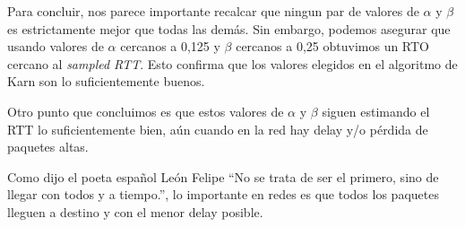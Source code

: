 Para concluir, nos parece importante recalcar que ningun par de valores de $\alpha$ y $\beta$ es estrictamente mejor que todas las demás. Sin embargo, podemos asegurar que usando valores de $\alpha$ cercanos a 0,125 y $\beta$ cercanos a 0,25 obtuvimos un RTO cercano al \emph{sampled RTT}. Esto confirma que los valores elegidos en el algoritmo de Karn son lo suficientemente buenos.

Otro punto que concluimos es que estos valores de $\alpha$ y $\beta$ siguen estimando el RTT lo suficientemente bien, aún cuando en la red hay delay y/o pérdida de paquetes altas.


Como dijo el poeta español León Felipe ``No se trata de ser el primero, sino de llegar con todos y a tiempo.'', lo importante en redes es que todos los paquetes lleguen a destino y con el menor delay posible.